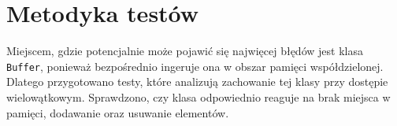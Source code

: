 \documentclass[a4paper]{article}
\begin{document}
	\section{Metodyka testów}
	Miejscem, gdzie potencjalnie może pojawić się najwięcej błędów jest klasa \texttt{Buffer}, ponieważ bezpośrednio ingeruje ona w obszar pamięci współdzielonej.
	Dlatego przygotowano testy, które analizują zachowanie tej klasy przy dostępie wielowątkowym. Sprawdzono, czy klasa odpowiednio reaguje na brak miejsca w pamięci, dodawanie oraz usuwanie elementów.
\end{document}
